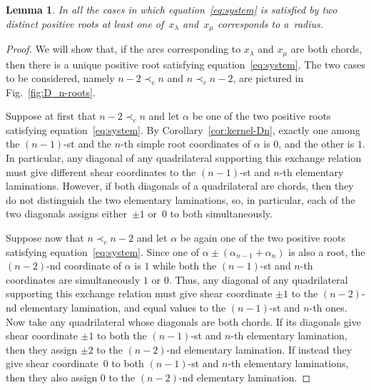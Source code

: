 \documentclass[pdftex]{sigma}
\numberwithin{equation}{section}
\newtheorem{Lemma}[Theorem]{Lemma}
\begin{document}
  \begin{Lemma} \label{lem:is-radius}
    In all the cases in which equation~\eqref{eq:system} is satisfied by two distinct positive roots at least one of~$x_\lambda$ and~$x_\mu$ corresponds to a~radius.
  \end{Lemma}
  \begin{proof}
    We will show that, if the arcs corresponding to $x_\lambda$ and $x_\mu$ are both chords, then there is a unique positive root satisfying equation~\eqref{eq:system}.
    The two cases to be considered, namely $n-2 \prec_c n$ and $n \prec_c n-2$, are pictured in Fig.~\ref{fig:D_n-roots}.

    Suppose at f\/irst that $n-2 \prec_c n$ and let $\alpha$ be one of the two positive roots satisfying equation~\eqref{eq:system}.
    By Corollary~\ref{cor:kernel-Dn}, exactly one among the $(n-1)$-st and the $n$-th simple root coordinates of $\alpha$ is $0$, and the other is $1$.
    In particular, any diagonal of any quadrilateral supporting this exchange relation must give dif\/ferent shear coordinates to the $(n-1)$-st and $n$-th elementary laminations.
    However, if both diagonals of a quadrilateral are chords, then they do not distinguish the two elementary laminations, so, in particular, each of the two diagonals assigns either~$\pm 1$ or~$0$ to both simultaneously.

    Suppose now that $n \prec_c n-2$ and let $\alpha$ be again one of the two positive roots satisfying equation~\eqref{eq:system}.
    Since one of $\alpha\pm(\alpha_{n-1}+\alpha_n)$ is also a root, the $(n-2)$-nd coordinate of $\alpha$ is $1$ while both the $(n-1)$-st and $n$-th coordinates are simultaneously $1$ or $0$.
    Thus, any diagonal of any quadrilateral supporting this exchange relation must give shear coordinate $\pm 1$ to the $(n-2)$-nd elementary lamination, and equal values to the $(n-1)$-st and $n$-th ones.
    Now take any quadrilateral whose diagonals are both chords.
    If its diagonals give shear coordinate $\pm 1$ to both the $(n-1)$-st and $n$-th elementary lamination, then they assign $\pm 2$ to the $(n-2)$-nd elementary lamination.
    If instead they give shear coordinate~$0$ to both $(n-1)$-st and $n$-th elementary laminations, then they also assign $0$ to the $(n-2)$-nd elementary lamination.
  \end{proof}
\end{document}
